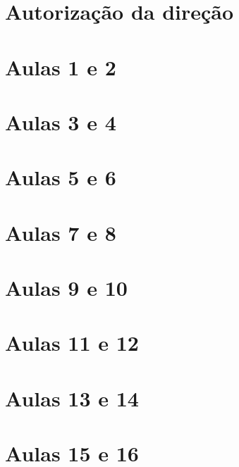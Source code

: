 

\begin{apendicesenv}
    
    \partapendices
\chapter{Autorização da direção} \label{ApendiceA} 
    
\chapter{Aulas 1 e 2} \label{ApendiceB} 
\chapter{Aulas 3 e 4} \label{ApendiceC} 
\chapter{Aulas 5 e 6} \label{ApendiceD} 
\chapter{Aulas 7 e 8} \label{ApendiceE} 
\chapter{Aulas 9 e 10} \label{ApendiceF} 
\chapter{Aulas 11 e 12} \label{ApendiceG} 
\chapter{Aulas 13 e 14} \label{ApendiceH} 
\chapter{Aulas 15 e 16} \label{ApendiceI} 

\end{apendicesenv}
